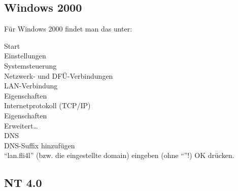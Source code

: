   \subsection{Windows 2000}

  Für Windows 2000 findet man das unter:

  \noindent Start \pfeil\\
  \hspace*{2ex}Einstellungen \pfeil\\
  \hspace*{4ex}Systemsteuerung \pfeil\\
  \hspace*{6ex}Netzwerk- und DFÜ-Verbindungen \pfeil\\
  \hspace*{8ex}LAN-Verbindung \pfeil\\
  \hspace*{10ex}Eigenschaften \pfeil\\
  \hspace*{12ex}Internetprotokoll (TCP/IP) \pfeil\\
  \hspace*{14ex}Eigenschaften \pfeil\\
  \hspace*{16ex}Erweitert\ldots \pfeil\\
  \hspace*{18ex}DNS \pfeil\\
  \hspace*{20ex}DNS-Suffix hinzufügen \pfeil\\

  ``lan.fli4l'' (bzw. die eingestellte domain) eingeben (ohne ``''!)
  \pfeil OK drücken.

\subsection{NT 4.0}

